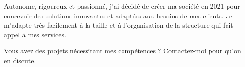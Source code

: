 

\begin{cvparagraph}

Autonome, rigoureux et passionné, j'ai décidé de créer ma société en 2021 pour concevoir des solutions innovantes et adaptées aux besoins de mes clients. Je m'adapte très facilement à la taille et à l'organisation de la structure qui fait appel à mes services.

Vous avez des projets nécessitant mes compétences ? Contactez-moi pour qu'on en discute.
\end{cvparagraph}
